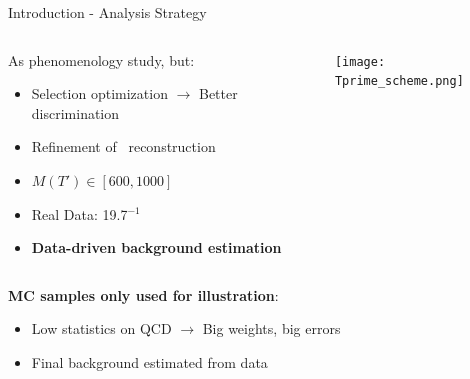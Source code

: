 \begin{frame}{Introduction - Analysis Strategy}
\vspace{-.5cm}
\begin{columns}

\begin{column}{.40\textwidth}
\begin{block}{}
\scriptsize{
As phenomenology study, but:
  \begin{itemize}
  \item Selection optimization $\to$ Better discrimination
  \item Refinement of \Tp~reconstruction
  \item $M(T')\in [600,1000]$ \GeVcc
  \item Real Data: 19.7$^{-1}$
  \item \textbf{Data-driven background estimation}
  \end{itemize}
}
\end{block}
\end{column}

\begin{column}{.60\textwidth}
  \begin{center}
    \texttt{[image: Tprime\_scheme.png]}\\
  \end{center}
\vspace{-.2cm}
\end{column}
\end{columns}

\vspace{-.1cm}
\begin{block}{}\scriptsize
\textbf{MC samples only used for illustration}:
\begin{itemize}
\item Low statistics on QCD $\to$ Big weights, big errors 
\item Final background estimated from data
\end{itemize}
\end{block}

\end{frame}

